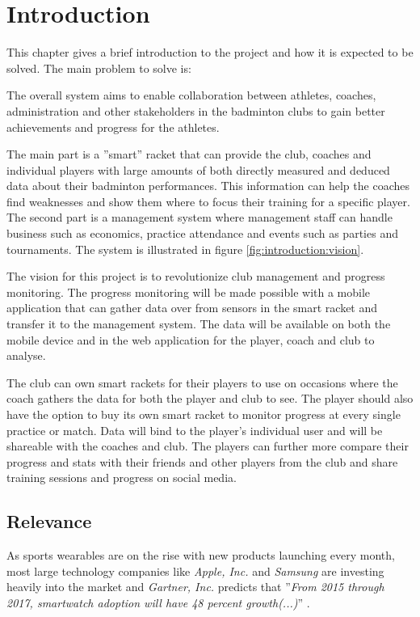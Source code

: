 \chapter{Introduction}
This chapter gives a brief introduction to the project and how it is expected to be solved.
The main problem to solve is:


The overall system aims to enable collaboration between athletes, coaches, administration and other stakeholders in the badminton clubs to gain better achievements and progress for the athletes.

The main part is a ''smart'' racket that can provide the club, coaches and individual players with large amounts of both directly measured and deduced data about their badminton performances.
This information can help the coaches find weaknesses and show them where to focus their training for a specific player.
The second part is a management system where management staff can handle business such as economics, practice attendance and events such as parties and tournaments.
The system is illustrated in figure \ref{fig:introduction:vision}.


The vision for this project is to revolutionize club management and progress monitoring.
The progress monitoring will be made possible with a mobile application that can gather data over  from sensors in the smart racket and transfer it to the management system.
The data will be available on both the mobile device and in the web application for the player, coach and club to analyse.

The club can own smart rackets for their players to use on occasions where the coach gathers the data for both the player and club to see.
The player should also have the option to buy its own smart racket to monitor progress at every single practice or match.
Data will bind to the player's individual user and will be shareable with the coaches and club.
The players can further more compare their progress and stats with their friends and other players from the club and share training sessions and progress on social media.

\section{Relevance}
As sports wearables are on the rise with new products launching every month, most large technology companies like \textit{Apple, Inc.} and \textit{Samsung} are investing heavily into the market and \textit{Gartner, Inc.} predicts that ''\textit{From 2015 through 2017, smartwatch adoption will have 48 percent growth(...)}'' \citep{introduction:relevance:gartner}.

